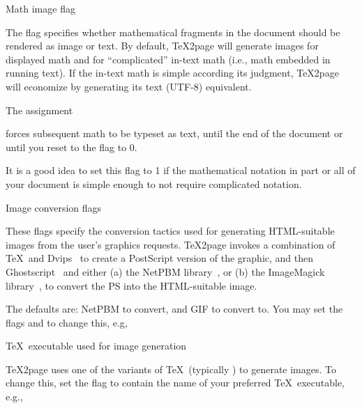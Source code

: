 \beginsection Math image flag

The \p{\TZPmathtext} flag
specifies whether mathematical fragments in the
document should be rendered as image or text.  By default, \TeX2page will
generate images for displayed math and for “complicated”
in-text math (i.e., math embedded in running text).   If the
in-text math is simple according its judgment, \TeX2page will
economize by generating its text (UTF-8) equivalent.

The assignment

forces subsequent math to be typeset as text, until the end of the document or
until you reset to the flag to 0.

It is a good idea to set this flag to 1 if the
mathematical notation in part or all of your document is simple enough to
not require complicated notation.

\beginsection Image conversion flags

%
These flags specify the conversion tactics used
for generating HTML-suitable images from the user’s graphics
requests.  \TeX2page invokes a combination of \TeX\ and
Dvips~\cite{dvips} to create a PostScript version of the
graphic, and then Ghostscript~\cite{gs} and either (a) the
NetPBM library~\cite{netpbm}, or (b) the ImageMagick
library~\cite{imagemagick}, to convert the PS into the
HTML-suitable image.

The defaults are: NetPBM
to convert, and GIF to convert to.
You may set the flags \p{\TZPimageconverter} and \p{\TZPimageformat} to
change this, e.g,


\beginsection \TeX\ executable used for image generation

\TeX2page uses one of the variants of \TeX\ (typically ) to
generate images. To change this, set the flag \p{\TZPtexprogname} to
contain the name of your preferred \TeX\ executable, e.g.,

